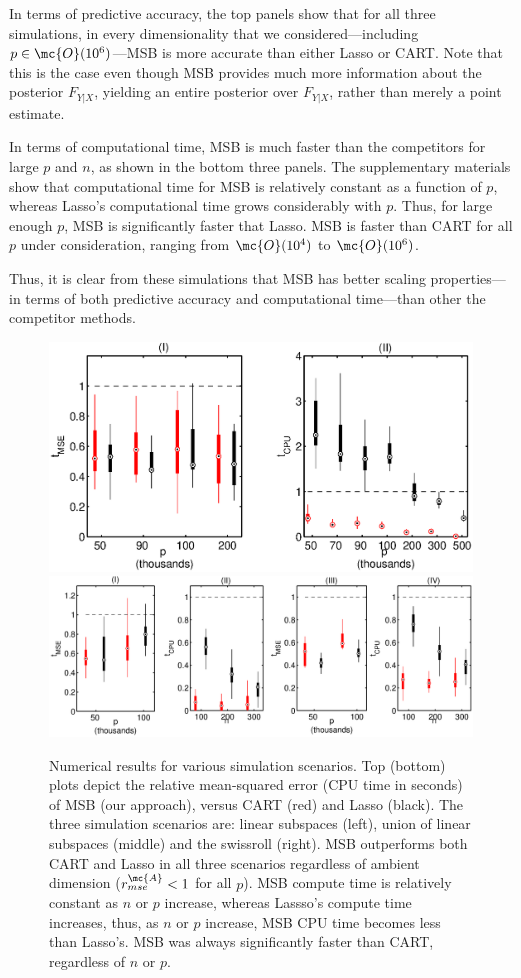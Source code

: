 In terms of predictive accuracy, the top panels show that for all three simulations,  in every dimensionality that we considered---including $p \in \mc{O}(10^6)$---MSB is more accurate than either Lasso or CART.  Note that this is the case even though MSB provides much more information about the posterior $F_{Y|X}$, yielding an entire posterior over $F_{Y|X}$, rather than merely a point estimate.

In terms of computational time, MSB is much faster than the competitors for large $p$ and $n$, as shown in the bottom three panels.  The supplementary materials show that computational time for MSB is relatively constant as a function of $p$, whereas Lasso's computational time grows considerably with $p$.  Thus, for large enough $p$, MSB is significantly faster that Lasso.  MSB is faster than CART for all $p$ under consideration, ranging from $\mc{O}(10^4)$ to $\mc{O}(10^6)$. 

Thus, it is clear from these simulations that MSB has better scaling properties---in terms of both predictive accuracy and computational time---than other the competitor methods. 



\begin{figure}[h!]
\centering
 \vskip -0pt 
\includegraphics[width=.6\linewidth]{../figs/experiment1.eps} 
\includegraphics[width=0.8\linewidth]{../figs/nonlinear.eps} 
 \vskip -10pt 
\caption{
Numerical results for various simulation scenarios.  Top (bottom) plots depict the relative mean-squared error (CPU time in seconds) of MSB (our approach), versus CART (red) and Lasso (black).  The three simulation scenarios are: linear subspaces (left), union of linear subspaces (middle) and the swissroll (right). MSB outperforms both CART and Lasso in all three scenarios regardless of ambient dimension ($r_{mse}^{\mc{A}}< 1$ for all $p$).  MSB compute time is relatively constant as $n$ or $p$ increase, whereas Lassso's compute time increases, thus, as $n$ or $p$ increase, MSB CPU time becomes less than Lasso's.  MSB was always significantly faster than CART, regardless of $n$ or $p$. } 

\label{fig:boxplots}
\end{figure}

